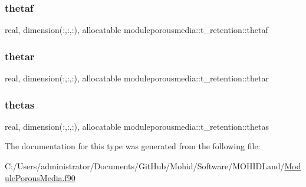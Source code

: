 \subsubsection{\texorpdfstring{thetaf}{thetaf}}
{\footnotesize\ttfamily real, dimension(\+:,\+:,\+:), allocatable moduleporousmedia\+::t\+\_\+retention\+::thetaf\hspace{0.3cm}{\ttfamily [private]}}

\mbox{\label{structmoduleporousmedia_1_1t__retention_a259033001dcf1b835194f2fc00ae9884}} 
\subsubsection{\texorpdfstring{thetar}{thetar}}
{\footnotesize\ttfamily real, dimension(\+:,\+:,\+:), allocatable moduleporousmedia\+::t\+\_\+retention\+::thetar\hspace{0.3cm}{\ttfamily [private]}}

\mbox{\label{structmoduleporousmedia_1_1t__retention_ad5b1b299783fe28efd3f602d0dc8d5f4}} 
\subsubsection{\texorpdfstring{thetas}{thetas}}
{\footnotesize\ttfamily real, dimension(\+:,\+:,\+:), allocatable moduleporousmedia\+::t\+\_\+retention\+::thetas\hspace{0.3cm}{\ttfamily [private]}}



The documentation for this type was generated from the following file\+:\begin{DoxyCompactItemize}
\item 
C\+:/\+Users/administrator/\+Documents/\+Git\+Hub/\+Mohid/\+Software/\+M\+O\+H\+I\+D\+Land/\mbox{\hyperlink{_module_porous_media_8f90}{Module\+Porous\+Media.\+f90}}\end{DoxyCompactItemize}
